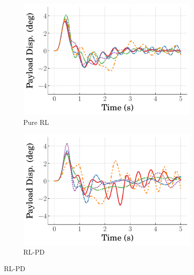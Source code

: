\begin{figure}[tb]
    \centering
    \begin{subfigure}[b]{0.49\textwidth}
        \centering
        \includegraphics[width=\textwidth]{figures/figures_RL_model_based_control/time_responses_crane/dpcrane_pure_RL/Payload_displacement_0p185_init_300000_steps.pdf}
        \caption{Pure RL}
        \label{subfig_chap2:dpcrane_payload_resp_300000steps_pure_RL}
    \end{subfigure}
    \hfill
    \begin{subfigure}[b]{0.49\textwidth}
	    \centering
	    \includegraphics[width=\textwidth]{figures/figures_RL_model_based_control/time_responses_crane/dpcrane_cont_gain_sched/Payload_displacement_0p185_init_300000_steps.pdf}
	    \caption{RL-PD}
	    \label{subfig_chap2:dpcrane_payload_resp_300000steps_gain_sched}
    \end{subfigure}

\end{figure}
